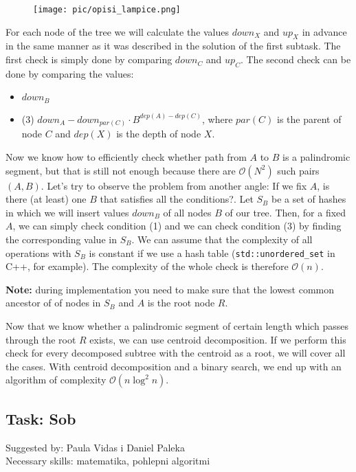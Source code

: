\documentclass[a4paper]{article}
\begin{document}
\begin{figure}[!htbp]
\centering
\texttt{[image: pic/opisi\_lampice.png]}
\end{figure}

For each node of the tree we will calculate the values $down_X$ and $up_X$ in
advance in the same manner as it was described in the solution of the first
subtask. The first check is simply done by comparing $down_C$ and $up_C$. The
second check can be done by comparing the values:

\begin{itemize}
  \item $down_B$
  \item (3) $down_A - down_{par(C)} \cdot B^{dep(A)-dep(C)}$, where $par(C)$ is
        the parent of node $C$ and $dep(X)$ is the depth of node $X$.
\end{itemize}

Now we know how to efficiently check whether path from $A$ to $B$ is a
palindromic segment, but that is still not enough because there are $\mathcal{O}(N^2)$
such pairs $(A, B)$. Let's try to observe the problem from another angle: If we
fix $A$, is there (at least) one $B$ that satisfies all the conditions?. Let
$S_B$ be a set of hashes in which we will insert values $down_B$ of all nodes
$B$ of our tree. Then, for a fixed $A$, we can simply check condition (1) and
we can check condition (3) by finding the corresponding value in $S_B$. We can
assume that the complexity of all operations with $S_B$ is constant if we use
a hash table (\texttt{std::unordered\_set} in C++, for example). The complexity
of the whole check is therefore $\mathcal{O}(n)$.

\textbf{Note:} during implementation you need to make sure that the lowest
common ancestor of of nodes in $S_B$ and $A$ is the root node $R$.

Now that we know whether a palindromic segment of certain length which passes
through the root $R$ exists, we can use centroid decomposition. If we perform
this check for every decomposed subtree with the centroid as a root, we will
cover all the cases. With centroid decomposition and a binary search, we end up
with an algorithm of complexity  $\mathcal{O}(n \log^2 n)$.

\subsection*{Task: Sob}
\textsf{Suggested by: Paula Vidas i Daniel Paleka}\\
\textsf{Necessary skills: matematika, pohlepni algoritmi}
\end{document}
